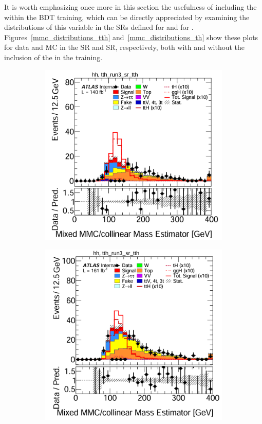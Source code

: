 It is worth emphasizing once more in this section the usefulness of including the \mmc within the BDT training, which can be directly appreciated by examining the distributions of this variable in the SRs defined for \ttH and for \thqb. Figures~\ref{mmc_distributions_tth} and~\ref{mmc_distributions_th} show these plots for data and MC in the \ttH SR and \thqb SR, respectively, both with and without the inclusion of the \mmc in the training.\begin{figure}[htbp]
  \centering
  \begin{subfigure}[t]{0.45\textwidth}
    \centering
    \includegraphics[width=\linewidth]{images/mmc_th_tth/run_2_wo_mmc_tth.png}
  \end{subfigure}
  \hfill
  \begin{subfigure}[t]{0.45\textwidth}
    \centering
    \includegraphics[width=\linewidth]{images/mmc_th_tth/run_3_wo_mmc_tth.png}

\end{subfigure}
\end{figure}
